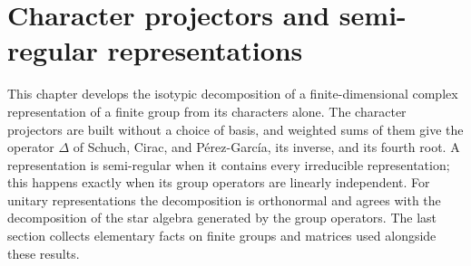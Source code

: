 \chapter{Character projectors and semi-regular representations}
\label{ch:character_projectors}

This chapter develops the isotypic decomposition of a finite-dimensional
complex representation of a finite group from its characters alone. The
character projectors are built without a choice of basis, and weighted sums of
them give the operator $\Delta$ of Schuch, Cirac, and P\'erez-Garc\'ia, its
inverse, and its fourth root. A representation is semi-regular when it
contains every irreducible representation; this happens exactly when its group
operators are linearly independent. For unitary representations the
decomposition is orthonormal and agrees with the decomposition of the star
algebra generated by the group operators. The last section collects elementary
facts on finite groups and matrices used alongside these results.





